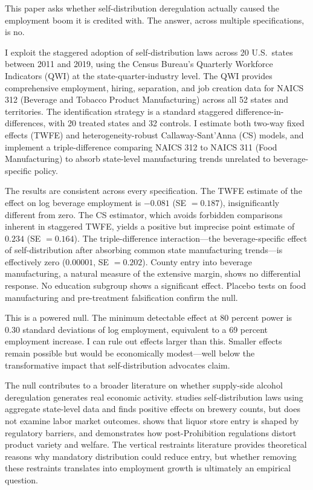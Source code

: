 \documentclass[12pt]{article}
\begin{document}
This paper asks whether self-distribution deregulation actually caused the employment boom it is credited with. The answer, across multiple specifications, is no.

I exploit the staggered adoption of self-distribution laws across 20 U.S.\ states between 2011 and 2019, using the Census Bureau's Quarterly Workforce Indicators (QWI) at the state-quarter-industry level. The QWI provides comprehensive employment, hiring, separation, and job creation data for NAICS 312 (Beverage and Tobacco Product Manufacturing) across all 52 states and territories. The identification strategy is a standard staggered difference-in-differences, with 20 treated states and 32 controls. I estimate both two-way fixed effects (TWFE) and heterogeneity-robust Callaway-Sant'Anna (CS) models, and implement a triple-difference comparing NAICS 312 to NAICS 311 (Food Manufacturing) to absorb state-level manufacturing trends unrelated to beverage-specific policy.

The results are consistent across every specification. The TWFE estimate of the effect on log beverage employment is $-0.081$ (SE $= 0.187$), insignificantly different from zero. The CS estimator, which avoids forbidden comparisons inherent in staggered TWFE, yields a positive but imprecise point estimate of $0.234$ (SE $= 0.164$). The triple-difference interaction---the beverage-specific effect of self-distribution after absorbing common state manufacturing trends---is effectively zero ($0.00001$, SE $= 0.202$). County entry into beverage manufacturing, a natural measure of the extensive margin, shows no differential response. No education subgroup shows a significant effect. Placebo tests on food manufacturing and pre-treatment falsification confirm the null.

This is a powered null. The minimum detectable effect at 80 percent power is 0.30 standard deviations of log employment, equivalent to a 69 percent employment increase. I can rule out effects larger than this. Smaller effects remain possible but would be economically modest---well below the transformative impact that self-distribution advocates claim.

The null contributes to a broader literature on whether supply-side alcohol deregulation generates real economic activity. \citet{colmenares2024craft} studies self-distribution laws using aggregate state-level data and finds positive effects on brewery counts, but does not examine labor market outcomes. \citet{seim2006empirical} shows that liquor store entry is shaped by regulatory barriers, and \citet{miravete2018market} demonstrates how post-Prohibition regulations distort product variety and welfare. The vertical restraints literature \citep{lafontaine2008vertical, asker2005measuring} provides theoretical reasons why mandatory distribution could reduce entry, but whether removing these restraints translates into employment growth is ultimately an empirical question.
\end{document}
